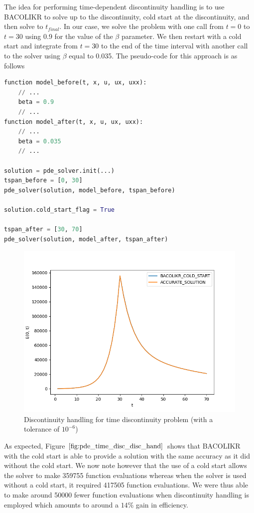 The idea for performing time-dependent discontinuity handling is to use BACOLIKR to solve up to the discontinuity, cold start at the discontinuity, and then solve to $t_{final}$. In our case, we solve the problem with one call from $t=0$ to $t=30$ using 0.9 for the value of the $\beta$ parameter. We then restart with a cold start and integrate from $t=30$ to the end of the time interval with another call to the solver using $\beta$ equal to 0.035. The pseudo-code for this approach is as follows

\begin{minipage}{\linewidth}
\begin{lstlisting}[language=Python]
function model_before(t, x, u, ux, uxx):
	// ...
	beta = 0.9
	// ...
function model_after(t, x, u, ux, uxx):
	// ...
	beta = 0.035
	// ...

solution = pde_solver.init(...)
tspan_before = [0, 30]
pde_solver(solution, model_before, tspan_before)

solution.cold_start_flag = True

tspan_after = [30, 70]
pde_solver(solution, model_after, tspan_after)

\end{lstlisting}
\end{minipage}

\begin{figure}[H]
\centering
\includegraphics[width=0.7\linewidth]{./figures/pde_time_disc_disc_hand}
\caption{Discontinuity handling for time discontinuity problem (with a tolerance of $10^{-6}$)}
\label{fig:pde_time_disc_disc_hand}
\end{figure}

As expected, Figure $\ref{fig:pde_time_disc_disc_hand}$ shows that BACOLIKR with the cold start is able to provide a solution with the same accuracy as it did without the cold start. We now note however that the use of a cold start allows the solver to make 359755 function evaluations whereas when the solver is used without a cold start, it required 417505 function evaluations. We were thus able to make around 50000 fewer function evaluations when discontinuity handling is employed which amounts to around a $14\%$ gain in efficiency.

